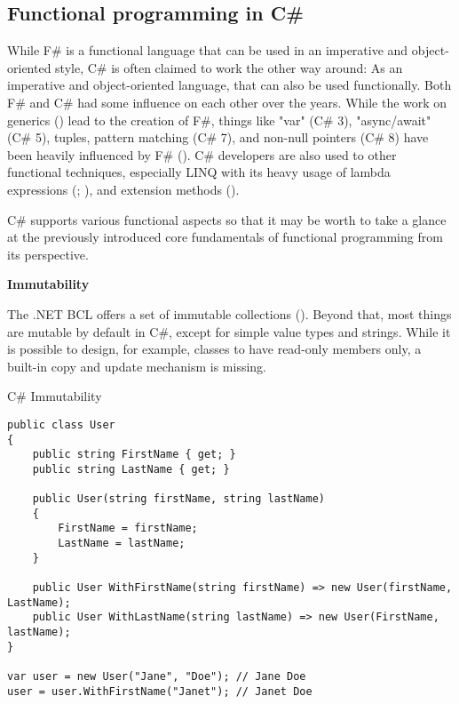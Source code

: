 \subsection{Functional programming in C\#}

While F\# is a functional language that can be used in an imperative and object-oriented style, C\# is often claimed to work the other way around: As an imperative and object-oriented language, that can also be used functionally. Both F\# and C\# had some influence on each other over the years. While the work on generics (\cite{kennedy_design_2001}) lead to the creation of F\#, things like "var" (C\# 3), "async/await" (C\# 5), tuples, pattern matching (C\# 7), and non-null pointers (C\# 8) have been heavily influenced by F\# (\cite[33]{syme_early_2018}). C\# developers are also used to other functional techniques, especially LINQ with its heavy usage of lambda expressions (\cite{bierman_lost_2007}; \cite[6]{meijer_world_2011}), and extension methods (\cite{biczo_runtime_2009}).

C\# supports various functional aspects so that it may be worth to take a glance at the previously introduced core fundamentals of functional programming from its perspective.

\textbf{Immutability}

The .NET BCL offers a set of immutable collections (\cite{brais_immutable_2017}). Beyond that, most things are mutable by default in C\#, except for simple value types and strings. While it is possible to design, for example, classes to have read-only members only, a built-in copy and update mechanism is missing.

\begin{listing}[H]
\caption{C\# Immutability}
\begin{verbatim}
public class User
{
    public string FirstName { get; }
    public string LastName { get; }

    public User(string firstName, string lastName)
    {
        FirstName = firstName;
        LastName = lastName;
    }

    public User WithFirstName(string firstName) => new User(firstName, LastName);
    public User WithLastName(string lastName) => new User(FirstName, lastName);
}

var user = new User("Jane", "Doe"); // Jane Doe
user = user.WithFirstName("Janet"); // Janet Doe
\end{verbatim}
\end{listing}

